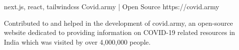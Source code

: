 \begin{cventries}


  \cventry
    {next.js, react, tailwindcss} %
    {Covid.army | Open Source} %
    {https://covid.army} %
    {} %
    {
      \begin{cvitems} %
        \item {Contributed to and helped in the development of covid.army, an open-source website dedicated to providing information on COVID-19 related resources in India which was visited by over 4,000,000 people.}  
      \end{cvitems}
    }


\end{cventries}
